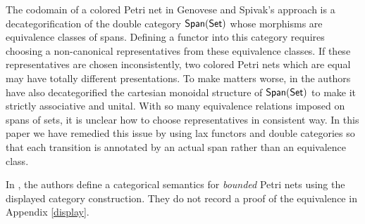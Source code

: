 \begin{itemize}
The codomain of a colored Petri net in Genovese and Spivak's approach is a decategorification of the double category $\mathsf{Span}(\mathsf{Set})$ whose morphisms are equivalence classes of spans. Defining a functor into this category requires choosing a non-canonical representatives from these equivalence classes. If these representatives are chosen inconsistently, two colored Petri nets which are equal may have totally different presentations. To make matters worse, in \cite{Guarded} the authors have also decategorified the cartesian monoidal structure of $\mathsf{Span}(\mathsf{Set})$ to make it strictly associative and unital. With so many equivalence relations imposed on spans of sets, it is unclear how to choose representatives in consistent way. In this paper we have remedied this issue by using lax functors and double categories so that each transition is annotated by an actual span rather than an equivalence class.

\end{itemize}
In \cite{Genovese_2022}, the authors define a categorical semantics for \emph{bounded} Petri nets using the displayed category construction. They do not record a proof of the equivalence in Appendix \ref{display}.

